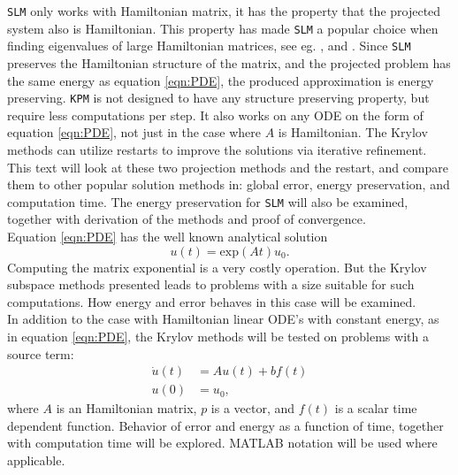 \texttt{SLM} only works with Hamiltonian matrix, it has the property that the projected system also is Hamiltonian.
This property has made \texttt{SLM} a popular choice when finding eigenvalues of large Hamiltonian matrices, see eg. \cite{SLM1}, \cite{SLM2} and \cite{SLM3}. Since \texttt{SLM} preserves the Hamiltonian structure of the matrix, and the projected problem has the same energy as equation \eqref{eqn:PDE}, the produced approximation is energy preserving. \texttt{KPM} is not designed to have any structure preserving property, but require less computations per step. It also works on any ODE on the form of equation \ref{eqn:PDE}, not just in the case where $A$ is Hamiltonian. 
The Krylov methods can utilize restarts to improve the solutions via iterative refinement.
This text will look at these two projection methods and the restart, and compare them to other popular solution methods in: global error, energy preservation, and computation time. The energy preservation for \texttt{SLM} will also be examined, together with derivation of the methods and proof of convergence. \\

\noindent Equation \eqref{eqn:PDE} has the well known analytical solution 
\begin{equation*}
u(t) = \text{exp}(At)u_0.
\end{equation*}
Computing the matrix exponential is a very costly operation. But the Krylov subspace methods presented leads to problems with a size suitable for such computations. How energy and error behaves in this case will be examined.\\

\noindent In addition to the case with Hamiltonian linear ODE's with constant energy, as in equation \eqref{eqn:PDE}, the Krylov methods will be tested on problems with a source term:
\begin{equation}
\begin{aligned}
\dot{u}(t) &= A u(t) + b f(t)\\
u(0)&= u_0,
\end{aligned}
\label{eqn:PDE1}
\end{equation}
where $A$ is an Hamiltonian matrix, $p$ is a vector, and $f(t)$ is a scalar time dependent function. Behavior of error and energy as a function of time, together with computation time will be explored.
MATLAB notation will be used where applicable.\\

